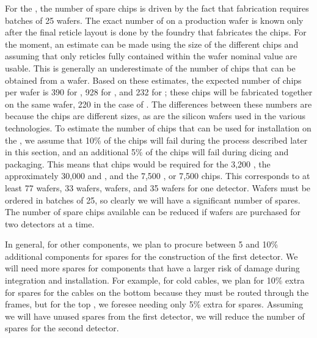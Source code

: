 For the , the number of
spare chips is driven by the fact that fabrication requires
batches of 25 wafers. The exact number of  
on a production wafer is known only after the final reticle layout
is done by the foundry that fabricates the chips. For the moment,
an estimate can be made using the size of the different 
chips and assuming that only reticles fully contained
within the wafer nominal value are usable. This is generally
an underestimate of the number of chips that can be obtained 
from a wafer. Based on these estimates, the expected number
of chips per wafer is 390 for , 928 for , and 232 for ; these chips will be fabricated together on the same wafer,
220 in the case of . The differences between these
numbers are because the chips are different sizes, as are the silicon wafers used in the various 
technologies. To estimate the number of chips that can be
used for installation on the , we assume that 10\% of the chips will fail during the 
process described later in this section, and an additional
5\% of the chips will fail during dicing and packaging. This means
that chips would be required for the 3,200 , the approximately 30,000  and
, and the 7,500 , or 7,500
 chips. This corresponds to at least 77  wafers,
33  wafers,  wafers, and 35  wafers for one
 detector. Wafers must be ordered
in batches of 25, so clearly we will have a significant number of
spares. The number of spare chips available can be 
reduced if wafers are purchased for two  detectors at a time. 

In general, for other components, we plan to procure between 5 and
10\% additional components for spares for the construction of the first 
detector. We will need more spares for components that have
a larger risk of damage during integration and 
installation. For example, for cold cables, we
plan for 10\% extra for spares for the cables on the bottom  because
they must be routed through the  frames, but
for the top , we foresee needing only 5\% extra for spares.
Assuming we will have unused spares from the first detector, we will reduce the number of spares for the second 
detector.

